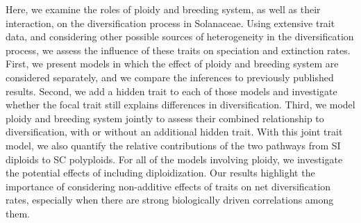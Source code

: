 Here, we examine the roles of ploidy and breeding system, as well as their interaction, on the diversification process in Solanaceae.
Using extensive trait data, and considering other possible sources of heterogeneity in the diversification process, we assess the influence of these traits on speciation and extinction rates.
First, we present models in which the effect of ploidy and breeding system are considered separately, and we compare the inferences to previously published results. 
Second, we add a hidden trait to each of those models and investigate whether the focal trait still explains differences in diversification.
Third, we model ploidy and breeding system jointly to assess their combined relationship to diversification, with or without an additional hidden trait.
With this joint trait model, we also quantify the relative contributions of the two pathways from SI diploids to SC polyploids.
For all of the models involving ploidy, we investigate the potential effects of including diploidization.
Our results highlight the importance of considering non-additive effects of traits on net diversification rates, especially when there are strong biologically driven correlations among them.